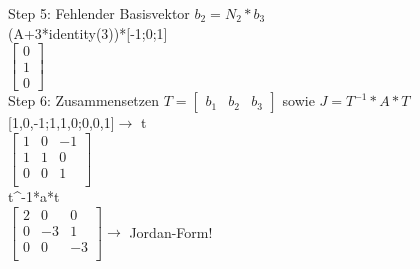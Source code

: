 Step 5: Fehlender Basisvektor $b_2=N_2*b_3$\\
(A+3*identity(3))*[-1;0;1]\\
\hspace*{2cm}$\begin{bmatrix}
	0\\
	1\\
	0
\end{bmatrix}$\\

Step 6: Zusammensetzen
$T=\begin{bmatrix}
	b_1 & b_2 & b_3
\end{bmatrix}$ sowie $J=T^{-1}*A*T$\\{}
[1,0,-1;1,1,0;0,0,1]$\rightarrow$ t\\
\hspace*{2cm}$\begin{bmatrix}
	1 & 0 & -1\\
	1 & 1 & 0\\
	0 & 0 & 1\\
\end{bmatrix}$\\
t\textasciicircum-1*a*t\\
\hspace*{2cm}$\begin{bmatrix}
	2 & 0 & 0\\
	0 & -3 & 1\\
	0 & 0 & -3\\
\end{bmatrix} \rightarrow $ Jordan-Form!